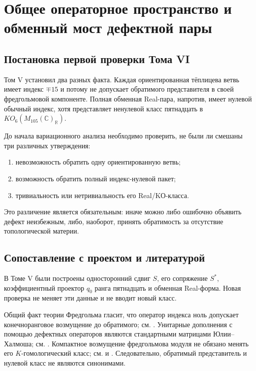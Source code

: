 \chapter{Общее операторное пространство и обменный мост дефектной пары}

\section{Постановка первой проверки Тома VI}

Том V установил два разных факта. Каждая ориентированная тёплицева ветвь
имеет индекс $\mp15$ и потому не допускает обратимого представителя в
своей фредгольмовой компоненте. Полная обменная Real-пара, напротив, имеет
нулевой обычный индекс, хотя представляет ненулевой класс пятнадцать в
$KO_6(M_{105}(\mathbb C)_{\mathbb R})$.

До начала вариационного анализа необходимо проверить, не были ли смешаны
три различных утверждения:
\begin{enumerate}
 \item невозможность обратить одну ориентированную ветвь;
 \item возможность обратить полный индекс-нулевой пакет;
 \item тривиальность или нетривиальность его Real/KО-класса.
\end{enumerate}

Это различение является обязательным: иначе можно либо ошибочно объявить
дефект неизбежным, либо, наоборот, принять обратимость за отсутствие
топологической материи.

\section{Сопоставление с проектом и литературой}

В Томе V были построены односторонний сдвиг $S$, его сопряжение $S^*$,
коэффициентный проектор $q_0$ ранга пятнадцать и обменная Real-форма.
Новая проверка не меняет эти данные и не вводит новый класс.

Общий факт теории Фредгольма гласит, что оператор индекса ноль допускает
конечноранговое возмущение до обратимого; см.
. Унитарные дополнения с помощью дефектных
операторов являются стандартными матрицами Юлии--Халмоша; см.
. Компактное возмущение фредгольмова модуля не
обязано менять его $K$-гомологический класс; см.
 и . Следовательно,
обратимый представитель и нулевой класс не являются синонимами.

